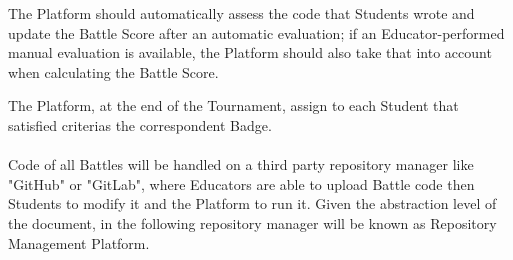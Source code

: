 The Platform should automatically assess the code that Students wrote and update the Battle Score after an automatic evaluation; if an Educator-performed manual evaluation is available, the Platform should also take that into account when calculating the 
Battle Score.

The Platform, at the end of the Tournament, assign to each Student that satisfied criterias the correspondent Badge.\\
\\
Code of all Battles will be handled on a third party repository manager like "GitHub" or "GitLab", where Educators are able to upload Battle code then Students to modify it and the Platform to run it. Given the abstraction level of the document, in the following repository manager will be known as Repository Management Platform.

\newpage

